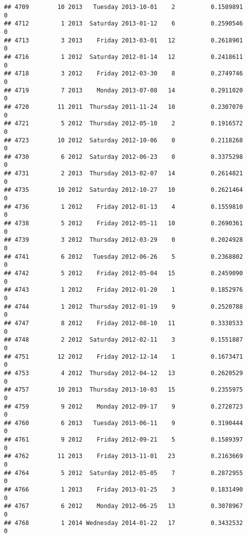 \documentclass[
]{article}
\begin{document}
\begin{verbatim}
## 4709        10 2013   Tuesday 2013-10-01    2          0.1589891             0
## 4712         1 2013  Saturday 2013-01-12    6          0.2590546             0
## 4713         3 2013    Friday 2013-03-01   12          0.2618901             0
## 4716         1 2012  Saturday 2012-01-14   12          0.2418611             0
## 4718         3 2012    Friday 2012-03-30    8          0.2749746             0
## 4719         7 2013    Monday 2013-07-08   14          0.2911020             0
## 4720        11 2011  Thursday 2011-11-24   10          0.2307070             0
## 4721         5 2012  Thursday 2012-05-10    2          0.1916572             0
## 4723        10 2012  Saturday 2012-10-06    0          0.2118268             0
## 4730         6 2012  Saturday 2012-06-23    0          0.3375298             0
## 4731         2 2013  Thursday 2013-02-07   14          0.2614821             0
## 4735        10 2012  Saturday 2012-10-27   10          0.2621464             0
## 4736         1 2012    Friday 2012-01-13    4          0.1559810             0
## 4738         5 2012    Friday 2012-05-11   10          0.2690361             0
## 4739         3 2012  Thursday 2012-03-29    0          0.2024928             0
## 4741         6 2012   Tuesday 2012-06-26    5          0.2368802             0
## 4742         5 2012    Friday 2012-05-04   15          0.2459090             0
## 4743         1 2012    Friday 2012-01-20    1          0.1852976             0
## 4744         1 2012  Thursday 2012-01-19    9          0.2520788             0
## 4747         8 2012    Friday 2012-08-10   11          0.3338533             0
## 4748         2 2012  Saturday 2012-02-11    3          0.1551887             0
## 4751        12 2012    Friday 2012-12-14    1          0.1673471             0
## 4753         4 2012  Thursday 2012-04-12   13          0.2620529             0
## 4757        10 2013  Thursday 2013-10-03   15          0.2355975             0
## 4759         9 2012    Monday 2012-09-17    9          0.2728723             0
## 4760         6 2013   Tuesday 2013-06-11    9          0.3190444             0
## 4761         9 2012    Friday 2012-09-21    5          0.1589397             0
## 4762        11 2013    Friday 2013-11-01   23          0.2163669             0
## 4764         5 2012  Saturday 2012-05-05    7          0.2872955             0
## 4766         1 2013    Friday 2013-01-25    3          0.1831490             0
## 4767         6 2012    Monday 2012-06-25   13          0.3078967             0
## 4768         1 2014 Wednesday 2014-01-22   17          0.3432532             0

\end{verbatim}
\end{document}
